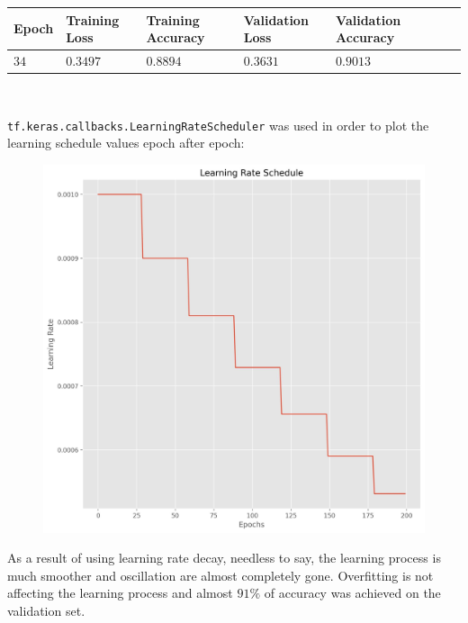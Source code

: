 \documentclass[11pt,a4paper]{article}
\begin{document}
\begin{center}
\begin{tabular}{|p{1.2cm}|p{1.8cm}|p{2cm}|p{2cm}|p{2cm}|p{2cm}|p{2cm}|}
\rowcolor{gray!50}
\hline
\textbf{Epoch} & \textbf{Training Loss} & \textbf{Training Accuracy} & \textbf{Validation Loss} & \textbf{Validation Accuracy}\\
\hline
$34$ & $0.3497$ & $0.8894$ & $0.3631$ & $0.9013$\\
\hline
\end{tabular}\\
\end{center}
\texttt{tf.keras.callbacks.LearningRateScheduler} was used in order to plot the learning schedule values epoch after epoch:
\begin{figure}[H]
    \centering
    \includegraphics[scale=0.5]{imgs/experiments/images/6/Experiment-6-fold-1.h5-lr-decay.jpg}
\end{figure}
\noindent
As a result of using learning rate decay, needless to say, the learning process is much smoother and oscillation are almost completely gone. Overfitting is not affecting the learning process and almost $91\%$ of accuracy was achieved on the validation set.
\end{document}
